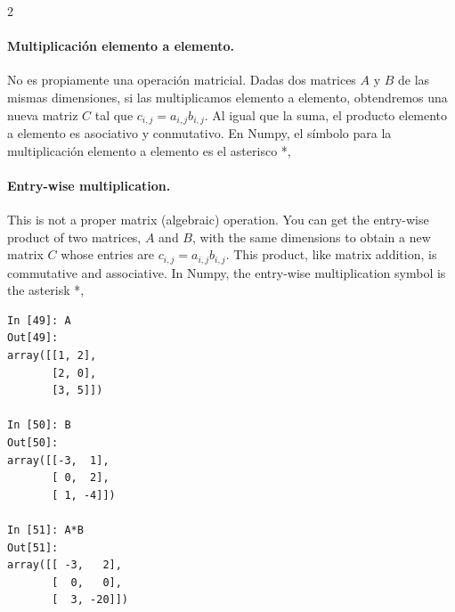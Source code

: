 \begin{paracol}{2}
\paragraph{Multiplicación elemento a elemento.} No es propiamente una operación matricial. Dadas dos matrices $A$ y $B$ de las mismas dimensiones, si las multiplicamos elemento a elemento, obtendremos una nueva matriz $C$ tal que $c_{i,j} = a_{i,j}b_{i,j}$. Al igual que la suma, el producto elemento a elemento es asociativo y conmutativo. 
En Numpy, el símbolo para la multiplicación elemento a elemento es el asterisco *,

\switchcolumn
\paragraph{Entry-wise multiplication.} This is not a proper matrix (algebraic) operation. You can get the entry-wise product of two matrices, $A$ and $B$, with the same dimensions to obtain a new matrix $C$ whose entries are $c_{i,j} = a_{i,j}b_{i,j}$. This product, like matrix addition, is commutative and associative. In Numpy, the entry-wise multiplication symbol is the asterisk *, 
\end{paracol}
\begin{center}
    \begin{minipage}{.5\textwidth}
        \begin{verbatim}
In [49]: A
Out[49]: 
array([[1, 2],
       [2, 0],
       [3, 5]])

In [50]: B
Out[50]: 
array([[-3,  1],
       [ 0,  2],
       [ 1, -4]])

In [51]: A*B
Out[51]: 
array([[ -3,   2],
       [  0,   0],
       [  3, -20]])
\end{verbatim}
\end{minipage}
\end{center}
